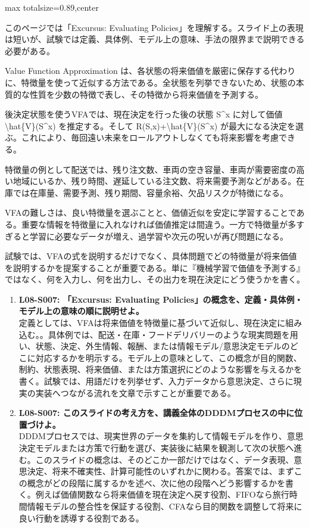 \begin{minipage}[t]{0.58\textwidth}
\begin{adjustbox}{max totalsize={\textwidth}{0.89\textheight},center}
\begin{minipage}{\textwidth}\scriptsize
{}このページでは「Excursus: Evaluating Policies」を理解する。スライド上の表現は短いが、試験では定義、具体例、モデル上の意味、手法の限界まで説明できる必要がある。\par
Value Function Approximation は、各状態の将来価値を厳密に保存する代わりに、特徴量を使って近似する方法である。全状態を列挙できないため、状態の本質的な性質を少数の特徴で表し、その特徴から将来価値を予測する。\par
後決定状態を使うVFAでは、現在決定を行った後の状態 S\textasciicircum{}x に対して価値 \textbackslash{}hat\{V\}(S\textasciicircum{}x) を推定する。そして R(S,x)+\textbackslash{}hat\{V\}(S\textasciicircum{}x) が最大になる決定を選ぶ。これにより、毎回遠い未来をロールアウトしなくても将来影響を考慮できる。\par
特徴量の例として配送では、残り注文数、車両の空き容量、車両が需要密度の高い地域にいるか、残り時間、遅延している注文数、将来需要予測などがある。在庫では在庫量、需要予測、残り期間、容量余裕、欠品リスクが特徴になる。\par
VFAの難しさは、良い特徴量を選ぶことと、価値近似を安定に学習することである。重要な情報を特徴量に入れなければ価値推定は間違う。一方で特徴量が多すぎると学習に必要なデータが増え、過学習や次元の呪いが再び問題になる。\par
試験では、VFAの式を説明するだけでなく、具体問題でどの特徴量が将来価値を説明するかを提案することが重要である。単に『機械学習で価値を予測する』ではなく、何を入力し、何を出力し、その出力を現在決定にどう使うかを書く。\par{}\begin{enumerate}\item \textbf{L08-S007: 「Excursus: Evaluating Policies」の概念を、定義・具体例・モデル上の意味の順に説明せよ。}\\定義としては、VFAは将来価値を特徴量に基づいて近似し、現在決定に組み込む。。具体例では、配送・在庫・フードデリバリーのような現実問題を用い、状態、決定、外生情報、報酬、または情報モデル/意思決定モデルのどこに対応するかを明示する。モデル上の意味として、この概念が目的関数、制約、状態表現、将来価値、または方策選択にどのような影響を与えるかを書く。試験では、用語だけを列挙せず、入力データから意思決定、さらに現実の実装へつながる流れを文章で示すことが重要である。\item \textbf{L08-S007: このスライドの考え方を、講義全体のDDDMプロセスの中に位置づけよ。}\\DDDMプロセスでは、現実世界のデータを集約して情報モデルを作り、意思決定モデルまたは方策で行動を選び、実装後に結果を観測して次の状態へ進む。このスライドの概念は、そのどこか一部だけではなく、データ表現、意思決定、将来不確実性、計算可能性のいずれかに関わる。答案では、まずこの概念がどの段階に属するかを述べ、次に他の段階へどう影響するかを書く。例えば価値関数なら将来価値を現在決定へ戻す役割、FIFOなら旅行時間情報モデルの整合性を保証する役割、CFAなら目的関数を調整して将来に良い行動を誘導する役割である。\end{enumerate}

\end{minipage}
\end{adjustbox}
\end{minipage}

